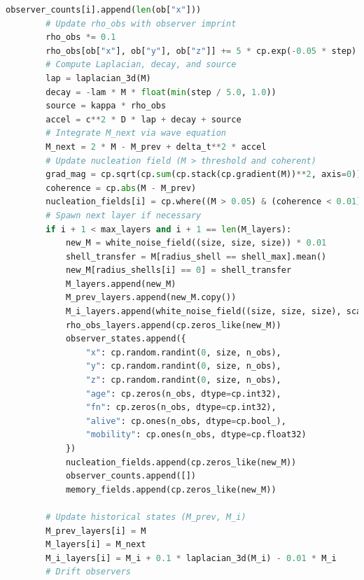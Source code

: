 \begin{lstlisting}[language=Python]
        observer_counts[i].append(len(ob["x"]))
        # Update rho_obs with observer imprint
        rho_obs *= 0.1
        rho_obs[ob["x"], ob["y"], ob["z"]] += 5 * cp.exp(-0.05 * step)
        # Compute Laplacian, decay, and source
        lap = laplacian_3d(M)
        decay = -lam * M * float(min(step / 5.0, 1.0))
        source = kappa * rho_obs
        accel = c**2 * D * lap + decay + source
        # Integrate M_next via wave equation
        M_next = 2 * M - M_prev + delta_t**2 * accel
        # Update nucleation field (M > threshold and coherent)
        grad_mag = cp.sqrt(cp.sum(cp.stack(cp.gradient(M))**2, axis=0))
        coherence = cp.abs(M - M_prev)
        nucleation_fields[i] = cp.where((M > 0.05) & (coherence < 0.01), M, 0)
        # Spawn next layer if necessary
        if i + 1 < max_layers and i + 1 == len(M_layers):
            new_M = white_noise_field((size, size, size)) * 0.01
            shell_transfer = M[radius_shell == shell_max].mean()
            new_M[radius_shells[i] == 0] = shell_transfer
            M_layers.append(new_M)
            M_prev_layers.append(new_M.copy())
            M_i_layers.append(white_noise_field((size, size, size), scale=0.001))
            rho_obs_layers.append(cp.zeros_like(new_M))
            observer_states.append({
                "x": cp.random.randint(0, size, n_obs),
                "y": cp.random.randint(0, size, n_obs),
                "z": cp.random.randint(0, size, n_obs),
                "age": cp.zeros(n_obs, dtype=cp.int32),
                "fn": cp.zeros(n_obs, dtype=cp.int32),
                "alive": cp.ones(n_obs, dtype=cp.bool_),
                "mobility": cp.ones(n_obs, dtype=cp.float32)
            })
            nucleation_fields.append(cp.zeros_like(new_M))
            observer_counts.append([])
            memory_fields.append(cp.zeros_like(new_M))

        # Update historical states (M_prev, M_i)
        M_prev_layers[i] = M
        M_layers[i] = M_next
        M_i_layers[i] = M_i + 0.1 * laplacian_3d(M_i) - 0.01 * M_i
        # Drift observers
\end{lstlisting}



